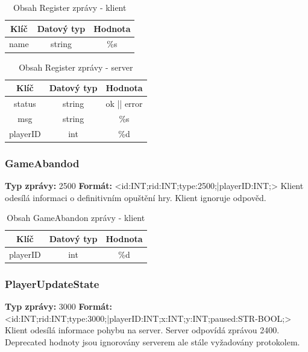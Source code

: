 \documentclass[12pt, a4paper]{article}
\begin{document}
    \begin{table}[H]
        \centering
        \begin{tabular}{|c|c|c|}
            \hline
            Klíč & Datový typ & Hodnota \\
            \hline
            \hline
            name & string & \%s \\
            \hline
        \end{tabular}
        \caption{Obsah Register zprávy - klient}
    \end{table}

    \begin{table}[H]
        \centering
        \begin{tabular}{|c|c|c|}
            \hline
            Klíč & Datový typ & Hodnota \\
            \hline
            \hline
            status & string & ok || error \\
            \hline
            msg & string & \%s \\
            \hline
            playerID & int & \%d \\
            \hline
        \end{tabular}
        \caption{Obsah Register zprávy - server}
    \end{table}

\subsubsection{GameAbandod}
\textbf{Typ zprávy: } 2500 \newline
\textbf{Formát: } \newline  <id:INT;rid:INT;type:2500;|playerID:INT;> \newline
Klient odesílá informaci o definitivním opuštění hry. Klient ignoruje odpověd. \newline

    \begin{table}[H]
        \centering
        \begin{tabular}{|c|c|c|}
            \hline
            Klíč & Datový typ & Hodnota \\
            \hline
            \hline
            playerID & int & \%d \\
            \hline
        \end{tabular}
        \caption{Obsah GameAbandon zprávy - klient}
    \end{table}

\subsubsection{PlayerUpdateState}
\textbf{Typ zprávy: } 3000 \newline
\textbf{Formát: } \newline  <id:INT;rid:INT;type:3000;|playerID:INT;x:INT;y:INT;paused:STR-BOOL;> \newline
Klient odesílá informace pohybu na server. Server odpovídá zprávou 2400. Deprecated hodnoty jsou ignorovány serverem
ale stále vyžadovány protokolem. \newline
\end{document}

